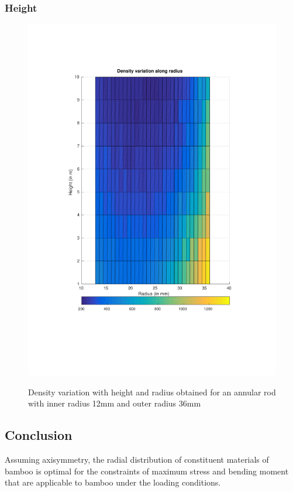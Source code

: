 \documentclass[10pt]{article}
\begin{document}
\subsubsection{Height}
\begin{figure}[H]
\begin{center}
	\includegraphics[clip, trim=2cm 5cm 2cm 3cm, width=1.00\textwidth]{./Plots/height/height.pdf}
	\label{fig:height}
	\caption{Density variation with height and radius obtained for an annular rod with inner radius 12mm and outer radius 36mm}
\end{center}
\end{figure}

\subsection{Conclusion}
Assuming axisymmetry, the radial distribution of constituent materials of bamboo is optimal for the constraints of maximum stress and bending moment that are applicable to bamboo under the loading conditions.
\end{document}
